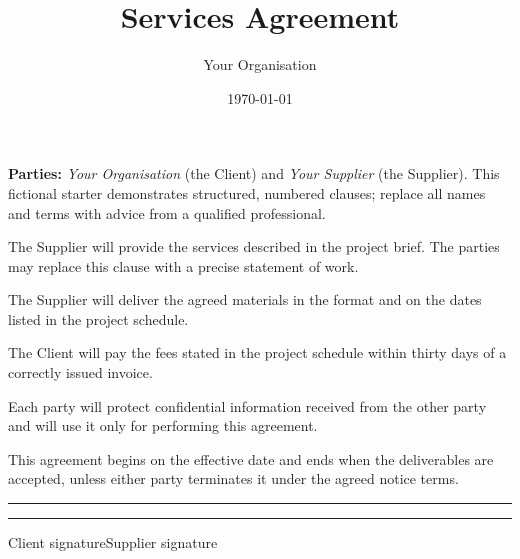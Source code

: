 \documentclass[11pt,a4paper]{article}
\title{Services Agreement}
\author{Your Organisation}
\date{\today}
\begin{document}
\maketitle

\noindent\textbf{Parties:} \emph{Your Organisation} (the Client) and
\emph{Your Supplier} (the Supplier). This fictional starter demonstrates
structured, numbered clauses; replace all names and terms with advice from a
qualified professional.

\begin{contract}
\Clause[title={Purpose and scope}]
The Supplier will provide the services described in the project brief. The
parties may replace this clause with a precise statement of work.

\SubClause[title={Deliverables}]
The Supplier will deliver the agreed materials in the format and on the dates
listed in the project schedule.

\Clause[title={Fees and payment}]
The Client will pay the fees stated in the project schedule within thirty days
of a correctly issued invoice.

\Clause[title={Confidentiality}]
Each party will protect confidential information received from the other party
and will use it only for performing this agreement.

\Clause[title={Term and termination}]
This agreement begins on the effective date and ends when the deliverables are
accepted, unless either party terminates it under the agreed notice terms.
\end{contract}

\bigskip
\noindent\rule{0.42\linewidth}{0.4pt}\hfill\rule{0.42\linewidth}{0.4pt}

\noindent Client signature\hfill Supplier signature
\end{document}
